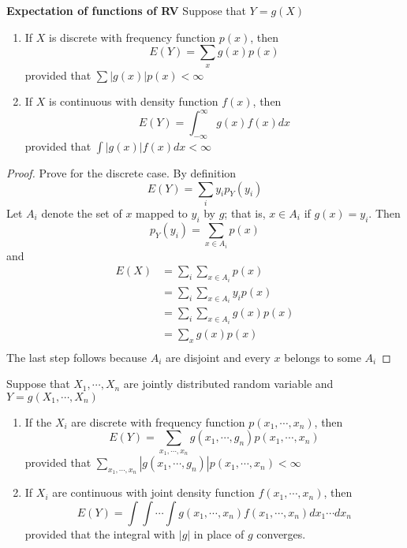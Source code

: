 \documentclass[11pt]{article}
\begin{document}
\begin{theorem*}
  \textbf{Expectation of functions of RV} Suppose that $Y = g(X)$
  \begin{enumerate}
    \item If $X$ is discrete with frequency function $p(x)$, then
    \[
      E(Y) = \sum_{x} g(x) p(x)
    \]
    provided that $\sum |g(x)|p(x) < \infty$
    \item If $X$ is continuous with density function $f(x)$, then
    \[
      E(Y) = \int_{-\infty}^{\infty} g(x) f(x) dx
    \]
    provided that $\int |g(x)| f(x) dx < \infty$
  \end{enumerate}
  \begin{proof}
    Prove for the discrete case. By definition
    \[
      E(Y) = \sum_{i} y_i p_Y (y_i)
    \]
    Let $A_i$ denote the set of $x$ mapped to $y_i$ by $g$; that is, $x\in A_i$ if $g(x) = y_i$. Then
    \[
      p_Y (y_i) = \sum_{x\in A_i} p(x)
    \]
    and
    \begin{align*}
      E(X) &= \sum_{i}\sum_{x\in A_i} p(x)\\
      &= \sum_{i} \sum_{x\in A_i} y_i p(x) \tag{Note that $\forall x\in A_i$, $g(x) = y_i$} \\
      &= \sum_{i} \sum_{x\in A_i} g(x) p(x) \\
      &= \sum_{x} g(x) p(x) \\
    \end{align*}
    The last step follows because $A_i$ are disjoint and every $x$ belongs to some $A_i$
  \end{proof}

\end{theorem*}


\begin{theorem*}
  Suppose that $X_1, \cdots, X_n$ are jointly distributed random variable and $Y = g(X_1, \cdots, X_n)$
  \begin{enumerate}
    \item If the $X_i$ are discrete with frequency function $p(x_1, \cdots, x_n)$, then
    \[
      E(Y) = \sum_{x_1,\cdots, x_n} g(x_1,\cdots, g_n) p(x_1, \cdots, x_n)
    \]
    provided that $\sum_{x_1,\cdots, x_n} | g(x_1,\cdots, g_n) | p(x_1, \cdots, x_n) < \infty$
    \item If $X_i$ are continuous with joint density function $f(x_1, \cdots, x_n)$, then
    \[
      E(Y) = \int\int \cdots \int g(x_1,\cdots,x_n)f(x_1, \cdots, x_n)dx_1 \cdots dx_n
    \]
    provided that the integral with $|g|$ in place of $g$ converges.
  \end{enumerate}
\end{theorem*}
\end{document}
